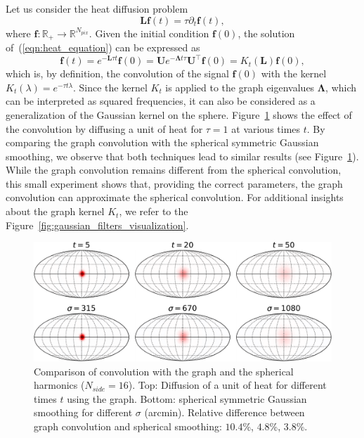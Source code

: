 \documentclass[final,twocolumn,3p,times,sort&compress]{elsarticle}
\newcommand{\nati}[1]{{\color[rgb]{.1,.6,.1}{#1}}}
\newcommand{\todo}[1]{{\color[rgb]{.6,.1,.6}{#1}}}
\newcommand{\figref}[1]{Figure~\ref{fig:#1}}
\newcommand{\eqnref}[1]{(\ref{eqn:#1})}
\renewcommand{\b}[1]{{\bm{#1}}}   %
\newcommand{\1}{\b{1}}              %
\newcommand{\0}{\b{0}}              %
\newcommand{\g}[1]{\b{#1}}
\renewcommand{\L}{\b{L}}
\newcommand{\U}{\b{U}}
\newcommand{\trans}{^\intercal}
\newcommand{\R}{\mathbb{R}}
\newcommand{\bLambda}{\b{\Lambda}}
\begin{document}
Let us consider the heat diffusion problem
\begin{equation}
  \L \b{f}(t) = \tau \partial_t \b{f}(t),
  \label{eqn:heat_equation}
\end{equation}
where $\b{f}: \R_+ \rightarrow \R^{N_{pix}}$. Given the initial condition
$\b{f}(0)$, the solution of~\eqnref{heat_equation} can be expressed as
\begin{equation*}
  \b{f}(t) = e^{-\L \tau t} \b{f}(0) = \U e^{-\bLambda t \tau} \U\trans \g{f}(0) = K_t(\L) \b{f}(0),
\end{equation*}
which is, by definition, the convolution of the signal $\b{f}(0)$ with the kernel $K_t(\lambda)=e^{-\tau t \lambda}$. Since the kernel $K_t$ is applied to the graph eigenvalues $\bLambda$, which can be interpreted as squared frequencies, it can also be considered as a generalization of the Gaussian kernel on the sphere. \figref{gaussian_filters_comparizon} shows the effect of the convolution by diffusing a unit of heat for $\tau=1$ at various times $t$. By comparing the graph convolution with the spherical symmetric Gaussian smoothing, we observe that both techniques lead to similar results (see \figref{gaussian_filters_comparizon}). While the graph convolution remains different from the spherical convolution, this small experiment shows that, providing the correct parameters, the graph convolution can approximate the spherical convolution. For additional insights about the graph kernel $K_t$, we refer to the \figref{gaussian_filters_visualization}.

\begin{figure}
  \centering
  \includegraphics[width=\linewidth]{gaussian_filters_sphere}
  \caption{Comparison of convolution with the graph and the spherical harmonics ($N_{side} = 16$).
  Top: Diffusion of a unit of heat for different times $t$ using the graph.
  Bottom: spherical symmetric Gaussian smoothing for different $\sigma$ (arcmin).
  Relative difference between graph convolution and spherical smoothing: $10.4$\%, $4.8$\%, $3.8$\%.
}
  \label{fig:gaussian_filters_comparizon}
\end{figure}
\end{document}

